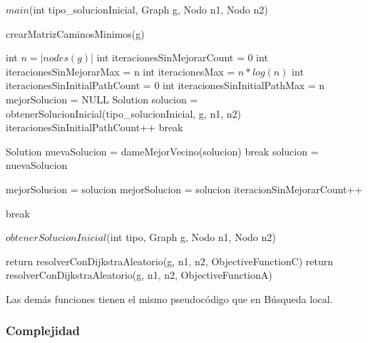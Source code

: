 \begin{algorithm}[H]
\caption{$main$(int tipo\_solucionInicial, Graph g, Nodo n1, Nodo n2)}
\begin{algorithmic}[1]
  \State crearMatrizCaminosMinimos(g)
  
  \State int $n = |nodes(g)|$
  \State int iteracionesSinMejorarCount = 0
  \State int iteracionesSinMejorarMax = n
  \State int iteracionesMax = $n * log(n)$
  \State int iteracionesSinInitialPathCount = 0
  \State int iteracionesSinInitialPathMax = n
  \State mejorSolucion = NULL
  	\State Solution solucion = obtenerSolucionInicial(tipo\_solucionInicial, g, n1, n2)	
    		\State iteracionesSinInitialPathCount++
			break
		\EndIf
        \EndIf

  
	    	\State Solution nuevaSolucion = dameMejorVecino(solucion)
			\State break	
		\EndIf    
		\State solucion = nuevaSolucion	
	    \EndWhile
	  
	  	\State mejorSolucion = solucion
	  	\State mejorSolucion = solucion
	  \Else
	  	\State iteracionSinMejorarCount++
	  \EndIf
	\EndIf
	
                \State break
        \EndIf
	  
    \EndFor
\end{algorithmic}
\end{algorithm}

\begin{algorithm}[H]
\caption{$obtenerSolucionInicial$(int tipo, Graph g, Nodo n1, Nodo n2)}
\begin{algorithmic}[1]
	\State return resolverConDijkstraAleatorio(g, n1, n2, ObjectiveFunctionC)
  \EndIf
  \State return resolverConDijkstraAleatorio(g, n1, n2, ObjectiveFunctionA)
\end{algorithmic}
\end{algorithm}

Las demás funciones tienen el mismo pseudocódigo que en Búsqueda local.

\subsubsection{Complejidad}

